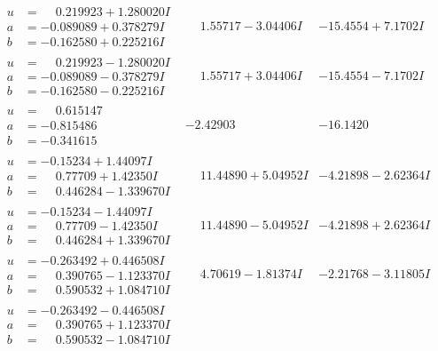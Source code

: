 \documentclass[1p]{elsarticle_modified}
\theoremstyle{definition}
\begin{document}
$$\begin{array}{c|c|c}
\begin{aligned}
u &= \phantom{-}0.219923 + 1.280020 I \\
a &= -0.089089 + 0.378279 I \\
b &= -0.162580 + 0.225216 I\end{aligned}
 & \phantom{-}1.55717 - 3.04406 I & -15.4554 + 7.1702 I \\ \hline\begin{aligned}
u &= \phantom{-}0.219923 - 1.280020 I \\
a &= -0.089089 - 0.378279 I \\
b &= -0.162580 - 0.225216 I\end{aligned}
 & \phantom{-}1.55717 + 3.04406 I & -15.4554 - 7.1702 I \\ \hline\begin{aligned}
u &= \phantom{-}0.615147\phantom{ +0.000000I} \\
a &= -0.815486\phantom{ +0.000000I} \\
b &= -0.341615\phantom{ +0.000000I}\end{aligned}
 & -2.42903\phantom{ +0.000000I} & -16.1420\phantom{ +0.000000I} \\ \hline\begin{aligned}
u &= -0.15234 + 1.44097 I \\
a &= \phantom{-}0.77709 + 1.42350 I \\
b &= \phantom{-}0.446284 - 1.339670 I\end{aligned}
 & \phantom{-}11.44890 + 5.04952 I & -4.21898 - 2.62364 I \\ \hline\begin{aligned}
u &= -0.15234 - 1.44097 I \\
a &= \phantom{-}0.77709 - 1.42350 I \\
b &= \phantom{-}0.446284 + 1.339670 I\end{aligned}
 & \phantom{-}11.44890 - 5.04952 I & -4.21898 + 2.62364 I \\ \hline\begin{aligned}
u &= -0.263492 + 0.446508 I \\
a &= \phantom{-}0.390765 - 1.123370 I \\
b &= \phantom{-}0.590532 + 1.084710 I\end{aligned}
 & \phantom{-}4.70619 - 1.81374 I & -2.21768 - 3.11805 I \\ \hline\begin{aligned}
u &= -0.263492 - 0.446508 I \\
a &= \phantom{-}0.390765 + 1.123370 I \\
b &= \phantom{-}0.590532 - 1.084710 I\end{aligned}

\end{array}$$
\end{document}

